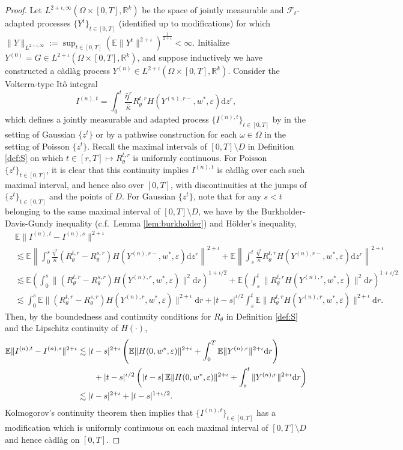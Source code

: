 \documentclass[11pt,letterpaper,reqno]{amsart}
\theoremstyle{definition}
\def\eps{\varepsilon}
\def\d{\mathrm{d}}
\def\E{\mathbb{E}}
\def\R{\mathbb{R}}
\def\cF{\mathcal{F}}
\begin{document}
\begin{proof}
Let $L^{2+\iota,\infty}(\Omega \times [0,T],\R^k)$ be the
space of jointly measurable and $\cF_t$-adapted processes $\{Y^t\}_{t \in [0,T]}$ (identified up to modifications)
for which
$\|Y\|_{L^{2+\iota,\infty}}:=\sup_{t \in [0,T]} (\E \|Y^t\|^{2+\iota})^{\frac{1}{2+\iota}}<\infty$.
Initialize $Y^{(0)}=G \in L^{2+\iota}(\Omega \times [0,T],\R^k)$, and
suppose inductively we have constructed a c\`adl\`ag process
$Y^{(n)} \in L^{2+\iota}(\Omega \times [0,T],\R^k)$.
Consider the Volterra-type It\^o integral
\[I^{(n),t}=\int_0^t \frac{\bar \eta^r}{\bar\kappa}
R_\theta^{t,r}H(Y^{(n),r-},w^*,\eps) \d z^r,\]
which defines a jointly measurable and adapted process $\{I^{(n),t}\}_{t \in [0,T]}$
by \cite[Lemma 2.A]{berger1980volterra} in the setting of Gaussian $\{z^t\}$ or
by a pathwise construction for each $\omega \in \Omega$ in the setting of
Poisson $\{z^t\}$. Recall the maximal intervals of $[0,T] \setminus D$ 
in Definition \ref{def:S} on which $t \in [r,T] \mapsto R_\theta^{t,r}$
is uniformly continuous. For Poisson
$\{z^t\}_{t \in [0,T]}$, it is clear that this continuity implies $I^{(n),t}$
is c\`adl\`ag over each such maximal interval, and hence also over
$[0,T]$, with discontinuities at the jumps of $\{z^t\}_{t \in [0,T]}$ and the
points of $D$. For Gaussian $\{z^t\}$, note that
for any $s<t$ belonging to the same maximal interval of $[0,T] \setminus D$,
we have by the Burkholder-Davis-Gundy inequality
(c.f.\ Lemma \ref{lem:burkholder}) and H\"older's inequality,
\begin{align*}
&\E\|I^{(n),t}-I^{(n),s}\|^{2+\iota}\\
&\lesssim \E\left\|\int_0^s \frac{\bar \eta^r}{\bar\kappa}
(R_\theta^{t,r}-R_\theta^{s,r})H(Y^{(n),r-},w^*,\eps) \d z^r\right\|^{2+\iota}
+\E\left\|\int_s^t \frac{\bar \eta^r}{\bar\kappa}
R_\theta^{t,r}H(Y^{(n),r-},w^*,\eps) \d z^r\right\|^{2+\iota}\\
&\lesssim \E\left(\int_0^s \|(R_\theta^{t,r}
-R_\theta^{s,r})H(Y^{(n),r},w^*,\eps)\|^2 \d r\right)^{1+\iota/2}
+\E\left(\int_s^t\|R_\theta^{t,r}H(Y^{(n),r},w^*,\eps)\|^2 \d
r\right)^{1+\iota/2}\\
&\lesssim \int_0^s \E \|(R_\theta^{t,r}
-R_\theta^{s,r})H(Y^{(n),r},w^*,\eps)\|^{2+\iota} \d r
+|t-s|^{\iota/2}\int_s^t \E\|R_\theta^{t,r}H(Y^{(n),r},w^*,\eps)\|^{2+\iota}
\d r.
\end{align*}
Then, by the boundedness and continuity conditions for $R_\theta$ in Definition
\ref{def:S} and the Lipschitz continuity of $H(\cdot)$,
\begin{align}
\E\|I^{(n),t}-I^{(n),s}\|^{2+\iota} &\lesssim
|t-s|^{2+\iota}\left(\E\|H(0,w^*,\eps)\|^{2+\iota}+\int_0^T
\E \|Y^{(n),r}\|^{2+\iota} \d r\right)\notag\\
&\qquad+|t-s|^{\iota/2}\left(|t-s|\,\E\|H(0,w^*,\eps)\|^{2+\iota}
+\int_s^t \|Y^{(n),r}\|^{2+\iota} \d r\right)\notag\\
&\lesssim |t-s|^{2+\iota}+|t-s|^{1+\iota/2}.\label{eq:Icontinuous}
\end{align}
Kolmogorov's continuity theorem then implies that $\{I^{(n),t}\}_{t \in [0,T]}$ 
has a modification which is uniformly continuous on each maximal interval of
$[0,T] \setminus D$ and hence c\`adl\`ag on $[0,T]$.


\end{proof}
\end{document}
